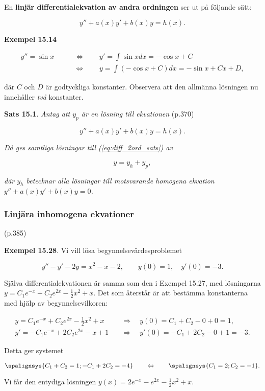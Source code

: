 \documentclass[11pt]{article}
\begin{document}
En \textbf{linjär differentialekvation av andra ordningen} ser ut på följande sätt:

\begin{equation}
    y'' + a(x)y' + b(x)y = h(x).
\end{equation}

\textbf{Exempel 15.14}

\begin{align}
    y'' = \sin x \qquad &\Leftrightarrow \qquad  y' = \int \sin x dx = -\cos x + C\\
                 \qquad &\Leftrightarrow \qquad y = \int (-\cos x + C) dx = -\sin x + Cx + D,
\end{align}

där $C$ och $D$ är godtyckliga konstanter. Observera att den allmänna lösningen nu innehåller \textit{två} konstanter.

\textbf{Sats 15.1}. \textit{Antag att $y_p$ är en lösning till ekvationen} (p.370)

\begin{equation}
    y'' + a(x)y' + b(x)y = h(x).
    \label{eq:diff_2ord_sats}
\end{equation}

\textit{Då ges samtliga lösningar till (\ref{eq:diff_2ord_sats}) av}

\begin{equation}
    y = y_h + y_p,
\end{equation}

\textit{där $y_h$ betecknar alla lösningar till motsvarande homogena ekvation $y'' + a(x)y' + b(x)y = 0$.}

\newpage
\subsubsection{Linjära inhomogena ekvationer} (p.385)

\textbf{Exempel 15.28}. Vi vill lösa begynnelsevärdesproblemet

\begin{equation}
    y'' - y' - 2y = x^2 - x - 2, \qquad y(0) = 1, \quad y'(0) = -3.
\end{equation}

Själva differentialekvationen är samma som den i Exempel 15.27, med lösningarna $y = C_1e^{-x} + C_2e^{2x}-\frac{1}{2}x^2 + x$. Det som återstår är att bestämma konstanterna med hjälp av begynnelsevilkoren:

\begin{align}
    y  = C_1e^{-x} + C_2e^{2x} - \tfrac{1}{2}x^2 + x \quad &\Rightarrow \quad y(0)  = C_1 + C_2 - 0 + 0 = 1,\\
    y' = -C_1e^{-x} + 2C_2e^{2x} - x + 1             \quad &\Rightarrow \quad y'(0) = -C_1 + 2C_2 - 0 + 1 = -3.
\end{align}

Detta ger systemet

\begin{equation}
    \spalignsys{
         C_1 +  C_2 =  1;
        -C_1 + 2C_2 = -4
    }
    \qquad \Leftrightarrow \qquad
    \spalignsys{
        C_1 = 2;
        C_2 = -1
    }.
\end{equation}

Vi får den entydiga lösningen $y(x) = 2e^{-x} - e^{2x} - \tfrac{1}{2}x^2 + x$.
\end{document}
